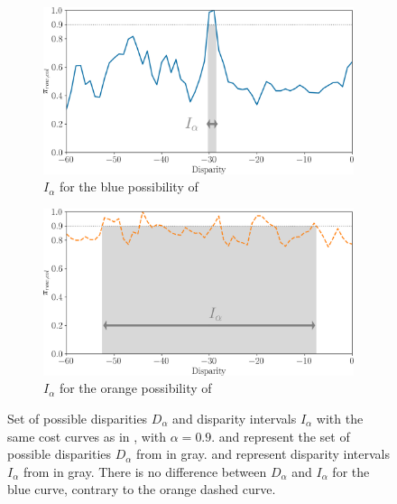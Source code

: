 \begin{figure}
\begin{subfigure}[t]{0.47\linewidth}
        \label{fig:disparity_intervals_b}
    \end{subfigure}
    \begin{subfigure}[t]{0.47\linewidth}
        \centering
        \includegraphics[width=\linewidth]{Images/Chap_5/disparity_interval_3.png}
        \caption{$I_\alpha$ for the blue possibility of }
        \label{fig:disparity_intervals_c}
    \end{subfigure}\hfill
    \begin{subfigure}[t]{0.47\linewidth}
        \centering
        \includegraphics[width=\linewidth]{Images/Chap_5/disparity_interval_4.png}
        \caption{$I_\alpha$ for the orange possibility of }
        \label{fig:disparity_intervals_d}
    \end{subfigure}\hfill
    \caption{Set of possible disparities $D_\alpha$ and disparity intervals $I_\alpha$ with the same cost curves as in , with $\alpha=0.9$.  and  represent the set of possible disparities $D_\alpha$ from  in gray.  and  represent disparity intervals $I_\alpha$ from  in gray. There is no difference between $D_\alpha$ and $I_\alpha$ for the blue curve, contrary to the orange dashed curve.}
    \label{fig:disparity_sets_and_intervals}
\end{figure}

